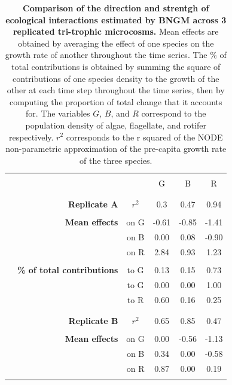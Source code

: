 \documentclass[11pt, oneside]{article}
\begin{document}
\newpage
\begin{table}[H]
\begin{center}
\caption{
    \textbf{Comparison of the direction and strentgh of ecological interactions estimated by BNGM across 3 replicated tri-trophic microcosms.}
    Mean effects are obtained by averaging the effect of one species on the growth rate of another throughout the time series.
    The \% of total contributions is obtained by summing the square of contributions of one species density to the growth of the other at each time step throughout the time series, then by computing the proportion of total change that it accounts for.
    The variables $G$, $B$, and $R$ correspond to the population density of algae, flagellate, and rotifer respectively.
    $r^2$ corresponds to the r squared of the NODE non-parametric approximation of the pre-capita growth rate of the three species.
}
\begin{tabular}{rrcccc}
	\hline
	\\
	& & & G & B & R \\
	& \\
	\hline
	& \\
	& \textbf{Replicate A} & $r^2$ & 0.3 & 0.47 & 0.94 \\
	& \\
	& \textbf{Mean effects} 
	&   on G &  -0.61 & -0.85 & -1.41 \\
	& & on B &   0.00 &  0.08 & -0.90 \\
    & & on R &   2.84 &  0.93 &  1.23 \\
	& \\
	& \textbf{\% of total contributions} 
	&   to G &   0.13 &  0.15 &  0.73 \\ 
    & & to G &   0.00 &  0.00 &  1.00 \\
    & & to R &   0.60 &  0.16 &  0.25 \\
	& \\
	\hline
	& \\
    & \textbf{Replicate B} & $r^2$  &  0.65 & 0.85 & 0.47 \\
	& \\
	& \textbf{Mean effects} 
    &   on G &  0.00 & -0.56 & -1.13 \\
	& & on B &  0.34 &  0.00 & -0.58 \\
	& & on R &  0.87 &  0.00 &  0.19 \\
	& \\

\end{tabular}
\end{center}
\end{table}
\end{document}
